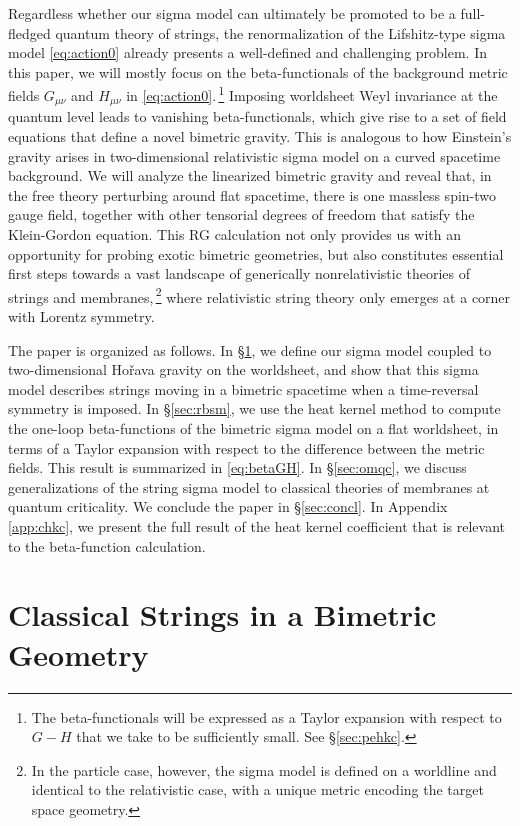 \documentclass[11pt]{article}
\begin{document}
Regardless whether our sigma model can ultimately be promoted to be a full-fledged quantum theory of strings, the renormalization of the Lifshitz-type sigma model \eqref{eq:action0} already presents a well-defined and challenging problem. 
In this paper, we will mostly focus on the beta-functionals of the background metric fields $G_{\mu\nu}$ and $H_{\mu\nu}$ in \eqref{eq:action0}.\,\footnote{The beta-functionals will be expressed as a Taylor expansion with respect to $G-H$ that we take to be sufficiently small. See \S\ref{sec:pehkc}.} Imposing worldsheet Weyl invariance at the quantum level leads to vanishing beta-functionals, which give rise to a set of field equations that define a novel bimetric gravity. This is analogous to how Einstein's gravity arises in two-dimensional relativistic sigma model on a curved spacetime background. We will analyze the linearized bimetric gravity and reveal that, in the free theory perturbing around flat spacetime, there is one massless spin-two gauge field, together with other tensorial degrees of freedom that satisfy the Klein-Gordon equation. This RG calculation not only provides us with an opportunity for probing exotic bimetric geometries, but also constitutes essential first steps towards a vast landscape of generically nonrelativistic theories of strings and membranes,\,\footnote{In the particle case, however, the sigma model is defined on a worldline and identical to the relativistic case, with a unique metric encoding the target space geometry.}  where relativistic string theory only emerges at a corner with Lorentz symmetry. 

The paper is organized as follows. In \S\ref{sec:csbg}, we define our sigma model coupled to two-dimensional Ho\v{r}ava gravity on the worldsheet, and show that this sigma model describes strings moving in a bimetric spacetime when a time-reversal symmetry is imposed. In \S\ref{sec:rbsm}, we use the heat kernel method to compute the one-loop beta-functions of the bimetric sigma model on a flat worldsheet, in terms of a Taylor expansion with respect to the difference between the metric fields. This result is summarized in \eqref{eq:betaGH}. In \S\ref{sec:omqc}, we discuss generalizations of the string sigma model to classical theories of membranes at quantum criticality. We conclude the paper in \S\ref{sec:concl}. In Appendix \ref{app:chkc}, we present the full result of the heat kernel coefficient that is relevant to the beta-function calculation.

\section{Classical Strings in a Bimetric Geometry} \label{sec:csbg}
\end{document}
